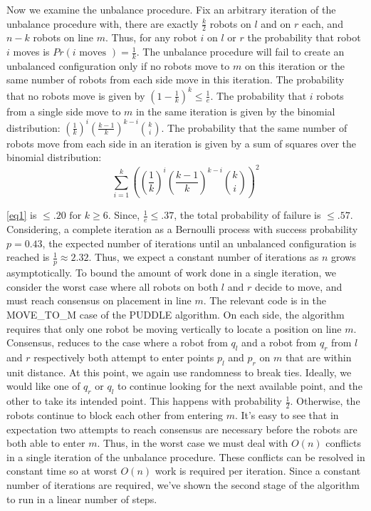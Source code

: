 \documentclass[preprint,10pt]{elsarticle}
\begin{document}
		Now we examine the unbalance procedure. Fix an arbitrary iteration of the unbalance procedure with,
		there are exactly $\frac{k}{2}$ robots on $l$ and on $r$ each, and $n - k$ robots on line $m$. 
		Thus, for any robot $i$ on $l$ or $r$ the probability that robot $i$ moves is 
		$Pr(i \text{ moves }) = \frac{1}{k}$. The unbalance procedure will fail to create an unbalanced configuration
		only if no robots move to $m$ on this iteration or the same number of robots from each side move
		in this iteration. %
		The probability that no robots move is given by $(1 - \frac{1}{k})^{k} \leq \frac{1}{e}$. 
		The probability that $i$ robots from a single side move to $m$ in the same iteration is given 
		by the binomial distribution: $(\frac{1}{k})^i (\frac{k-1}{k})^{k-i} {k\choose i}$.
		The probability that the same number of robots move from each side in an iteration is given 
		by a sum of squares over the binomial distribution:
		$$\sum_{i=1}^{k}{((\frac{1}{k})^i (\frac{k-1}{k})^{k-i} {k\choose i})^2} \label{eq1}$$

		\ref{eq1} is $\leq  .20 \text{ for } 
		k \geq 6$. Since, $\frac{1}{e} \leq .37$, the total probability of failure is $\leq .57$. Considering, a complete
		iteration as a Bernoulli process with success probability $p = 0.43$, the expected number of iterations until 
		an unbalanced configuration is reached is $\frac{1}{p} \approx 2.32$. Thus, we expect a constant number of iterations
		as $n$ grows asymptotically. To bound the amount of work done in a single iteration, we consider the worst case
		where all robots on both $l$ and $r$ decide to move, and must reach consensus on placement in line $m$. 
		The relevant code is in the MOVE\_TO\_M case of the PUDDLE algorithm. On each side, the algorithm requires that only 
		one robot be moving vertically to locate a position on line $m$. Consensus, reduces to the case where a robot
		from $q_l$ and a robot from $q_r$ from $l$ and $r$ respectively both attempt to enter 
		points $p_l$ and $p_r$ on $m$ that are within unit distance. At this point, we again use randomness
		to break ties. Ideally, we would like one of $q_r$ or $q_l$ to continue looking for the next available point,
		and the other to take its intended point. This happens with probability $\frac{1}{2}$. Otherwise, the robots 
		continue to block each other from entering $m$. It's easy to see that in expectation two attempts to reach
		consensus are necessary before the robots are both able to enter $m$. Thus, in the worst case we must deal with
		$O(n)$ conflicts in a single iteration of the unbalance procedure. These conflicts can be resolved in 
		constant time so at worst $O(n)$ work is required per iteration. Since a constant number of iterations are 
		required, we've shown the second stage of the algorithm to run in a linear number of steps. \\
\end{document}
